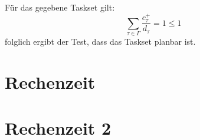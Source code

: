 \documentclass[DIN, pagenumber=false, fontsize=11pt, parskip=half]{scrartcl}
\begin{document}
\begin{enumerate}[label=\alph*)]
            Für das gegebene Taskset gilt:
            \begin{equation}
                \sum_{\tau \in \Gamma} \frac{c^+_\tau}{d_\tau} = 1 \leq 1
            \end{equation}
            folglich ergibt der Test, dass das Taskset planbar ist.
    \end{enumerate} 


    \appendix
    \section{Rechenzeit} \label{sec:app:rechenzeit}
    

    \section{Rechenzeit 2} \label{sec:app:rechenzeit2}
    
\end{document}

